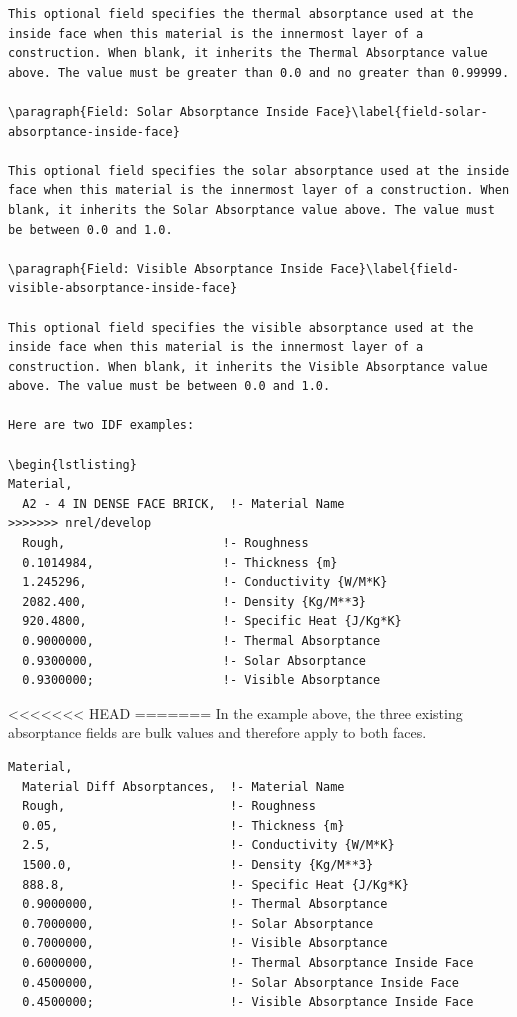 \begin{lstlisting}
This optional field specifies the thermal absorptance used at the inside face when this material is the innermost layer of a construction. When blank, it inherits the Thermal Absorptance value above. The value must be greater than 0.0 and no greater than 0.99999.

\paragraph{Field: Solar Absorptance Inside Face}\label{field-solar-absorptance-inside-face}

This optional field specifies the solar absorptance used at the inside face when this material is the innermost layer of a construction. When blank, it inherits the Solar Absorptance value above. The value must be between 0.0 and 1.0.

\paragraph{Field: Visible Absorptance Inside Face}\label{field-visible-absorptance-inside-face}

This optional field specifies the visible absorptance used at the inside face when this material is the innermost layer of a construction. When blank, it inherits the Visible Absorptance value above. The value must be between 0.0 and 1.0.

Here are two IDF examples:

\begin{lstlisting}
Material,
  A2 - 4 IN DENSE FACE BRICK,  !- Material Name
>>>>>>> nrel/develop
  Rough,                      !- Roughness
  0.1014984,                  !- Thickness {m}
  1.245296,                   !- Conductivity {W/M*K}
  2082.400,                   !- Density {Kg/M**3}
  920.4800,                   !- Specific Heat {J/Kg*K}
  0.9000000,                  !- Thermal Absorptance
  0.9300000,                  !- Solar Absorptance
  0.9300000;                  !- Visible Absorptance
\end{lstlisting}

<<<<<<< HEAD
=======
In the example above, the three existing absorptance fields are bulk values and therefore apply to both faces.

\begin{lstlisting}
Material,
  Material Diff Absorptances,  !- Material Name
  Rough,                       !- Roughness
  0.05,                        !- Thickness {m}
  2.5,                         !- Conductivity {W/M*K}
  1500.0,                      !- Density {Kg/M**3}
  888.8,                       !- Specific Heat {J/Kg*K}
  0.9000000,                   !- Thermal Absorptance
  0.7000000,                   !- Solar Absorptance
  0.7000000,                   !- Visible Absorptance
  0.6000000,                   !- Thermal Absorptance Inside Face
  0.4500000,                   !- Solar Absorptance Inside Face
  0.4500000;                   !- Visible Absorptance Inside Face
\end{lstlisting}

